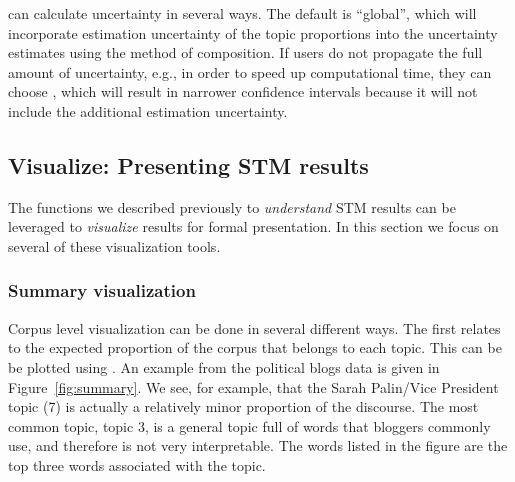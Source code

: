 \documentclass[article,shortnames]{jss}
\begin{document}
 can calculate uncertainty in several ways. The default is ``global'', which will incorporate estimation uncertainty of the topic proportions into the uncertainty estimates using the method of composition. If users do not propagate the full amount of uncertainty, e.g., in order to speed up computational time, they can choose , which will result in narrower confidence intervals because it will not include the additional estimation uncertainty.



\begin{Schunk}
\end{Schunk}


\subsection{Visualize: Presenting STM results}

The functions we described previously to \emph{understand} STM results can be leveraged to \emph{visualize} results for formal presentation. In this section we focus on several of these visualization tools.

\subsubsection{Summary visualization}

Corpus level visualization can be done in several different ways. The first relates to the expected proportion of the corpus that belongs to each topic. This can be be plotted using . An example from the political blogs data is given in Figure~\ref{fig:summary}. We see, for example, that the Sarah Palin/Vice President topic (7) is actually a relatively minor proportion of the discourse.  The most common topic, topic 3, is a general topic full of words that bloggers commonly use, and therefore is not very interpretable. The words listed in the figure are the top three words associated with the topic.
\end{document}
